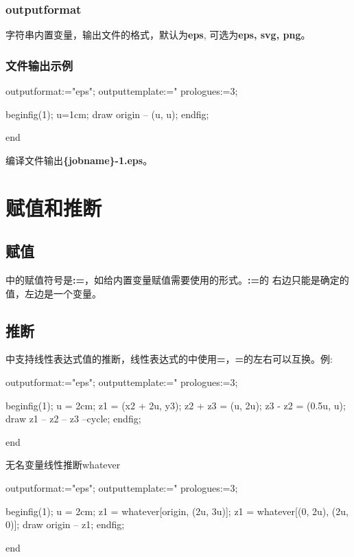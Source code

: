 \subsubsection{outputformat}

字符串内置变量，输出文件的格式，默认为{\bf eps}, 可选为{\bf eps, svg, png}。

\subsubsection{\mpost 文件输出示例}

\begin{mpostcode}
outputformat:="eps";
outputtemplate:="%
prologues:=3;

beginfig(1);
u=1cm;
draw origin -- (u, u);
endfig;

end
\end{mpostcode}

编译文件输出{\bf \{jobname\}-1.eps}。

\section{赋值和推断}

\subsection{赋值}

\mpost 中的赋值符号是{\bf :=}，如给内置变量赋值需要使用的形式。{\bf :=}的%
右边只能是确定的值，左边是一个变量。

\subsection{推断}

\mpost 中支持线性表达式值的推断，线性表达式的中使用{\bf =}，{\bf =}的左右可以互换。例:

\begin{mpostcode}
outputformat:="eps";
outputtemplate:="%
prologues:=3;

beginfig(1);
    u = 2cm;
    z1 = (x2 + 2u, y3);
    z2 + z3 = (u, 2u);
    z3 - z2 = (0.5u, u);
    draw z1 -- z2 -- z3 --cycle;
endfig;

end
\end{mpostcode}

无名变量线性推断{\color{red}whatever}
\begin{mpostcode}
outputformat:="eps";
outputtemplate:="%
prologues:=3;

beginfig(1);
    u = 2cm;
    z1 = whatever[origin, (2u, 3u)];
    z1 = whatever[(0, 2u), (2u, 0)];
    draw origin -- z1;
endfig;

end
\end{mpostcode}

